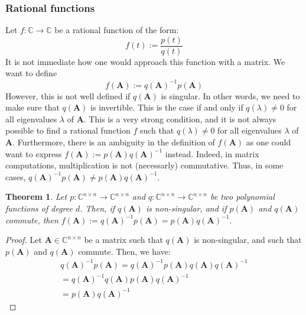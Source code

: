 \documentclass[12pt]{article}
\newtheorem{theorem}{Theorem}
\begin{document}
\subsubsection*{Rational functions}
Let $f:\mathbb{C}\rightarrow\mathbb{C}$ be a rational function of the form:
\begin{equation}
    f(t) := \frac{p(t)}{q(t)}
\end{equation}
It is not immediate how one would approach this function with a matrix. We want to define
\begin{equation}
    f(\mathbf{A}) := q(\mathbf{A})^{-1}p(\mathbf{A})
\end{equation}
However, this is not well defined if $q(\mathbf{A})$ is singular. In other words, we need to make sure that $q(\mathbf{A})$ is invertible. This is the case if and only if $q(\lambda) \neq 0$ for all eigenvalues $\lambda$ of $\mathbf{A}$. This is a very strong condition, and it is not always possible to find a rational function $f$ such that $q(\lambda) \neq 0$ for all eigenvalues $\lambda$ of $\mathbf{A}$. Furthermore, there is an ambiguity in the definition of $f(\mathbf{A})$ as one could want to express $f(\mathbf{A}) := p(\mathbf{A})q(\mathbf{A})^{-1}$ instead. Indeed, in matrix computations, multiplication is not (necessarly) commutative. Thus, in some cases, $q(\mathbf{A})^{-1}p(\mathbf{A}) \neq p(\mathbf{A})q(\mathbf{A})^{-1}$.
\begin{theorem}
    Let $p:\mathbb{C}^{n\times n}\rightarrow\mathbb{C}^{n\times n}$ and $q:\mathbb{C}^{n\times n}\rightarrow\mathbb{C}^{n\times n}$ be two polynomial functions of degree $d$. Then, if $q(\mathbf{A})$ is non-singular, and if $p(\mathbf{A})$ and $q(\mathbf{A})$ commute, then $f(\mathbf{A}) := q(\mathbf{A})^{-1}p(\mathbf{A}) = p(\mathbf{A})q(\mathbf{A})^{-1}$.
\end{theorem}
\begin{proof}
    Let $\mathbf{A}\in\mathbb{C}^{n\times n}$ be a matrix such that $q(\mathbf{A})$ is non-singular, and such that $p(\mathbf{A})$ and $q(\mathbf{A})$ commute. Then, we have:
    \begin{align*}
        q(\mathbf{A})^{-1}p(\mathbf{A}) = q(\mathbf{A})^{-1}p(\mathbf{A})q(\mathbf{A})q(\mathbf{A})^{-1} \\
        = q(\mathbf{A})^{-1}q(\mathbf{A})p(\mathbf{A})q(\mathbf{A})^{-1} \\
        = p(\mathbf{A})q(\mathbf{A})^{-1}
    \end{align*}
\end{proof}
\end{document}
